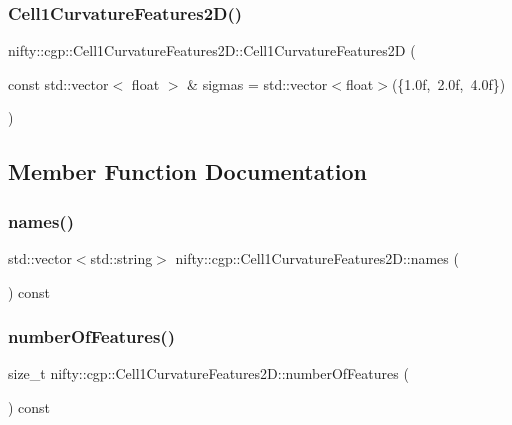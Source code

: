 \subsubsection{\texorpdfstring{Cell1\+Curvature\+Features2\+D()}{Cell1CurvatureFeatures2D()}}
{\footnotesize\ttfamily nifty\+::cgp\+::\+Cell1\+Curvature\+Features2\+D\+::\+Cell1\+Curvature\+Features2D (\begin{DoxyParamCaption}\item[{const std\+::vector$<$ float $>$ \&}]{sigmas = {\ttfamily std\+:\+:vector$<$float$>$(\{1.0f,~2.0f,~4.0f\})} }\end{DoxyParamCaption})\hspace{0.3cm}{\ttfamily [inline]}}



\subsection{Member Function Documentation}
\mbox{\label{classnifty_1_1cgp_1_1Cell1CurvatureFeatures2D_aaba27cb2a1f82c10bdef02bbd61a4ff8}} 
\subsubsection{\texorpdfstring{names()}{names()}}
{\footnotesize\ttfamily std\+::vector$<$std\+::string$>$ nifty\+::cgp\+::\+Cell1\+Curvature\+Features2\+D\+::names (\begin{DoxyParamCaption}{ }\end{DoxyParamCaption}) const\hspace{0.3cm}{\ttfamily [inline]}}

\mbox{\label{classnifty_1_1cgp_1_1Cell1CurvatureFeatures2D_a2e017a75d7fb8f015eb6ae020328f7d6}} 
\subsubsection{\texorpdfstring{number\+Of\+Features()}{numberOfFeatures()}}
{\footnotesize\ttfamily size\+\_\+t nifty\+::cgp\+::\+Cell1\+Curvature\+Features2\+D\+::number\+Of\+Features (\begin{DoxyParamCaption}{ }\end{DoxyParamCaption}) const\hspace{0.3cm}{\ttfamily [inline]}}

